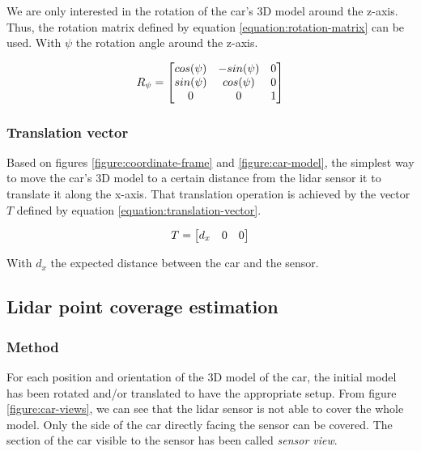\documentclass{scrartcl}
\begin{document}
    We are only interested in the rotation of the car's 3D model around the
    z-axis. Thus, the rotation matrix defined by equation 
    \ref{equation:rotation-matrix} can be used. With $\psi$ the rotation angle
    around the z-axis.

    \begin{equation}
      \centering
      R_{\psi} =
        \begin{bmatrix}
          cos(\psi) & -sin(\psi) & 0 \\
          sin(\psi) & cos(\psi) & 0 \\
          0 & 0 & 1
        \end{bmatrix}
        \label{equation:rotation-matrix}
    \end{equation}

    \subsubsection{Translation vector}

    Based on figures \ref{figure:coordinate-frame} and \ref{figure:car-model},
    the simplest way to move the car's 3D model to a certain
    distance from the lidar sensor it to translate it along the x-axis. That
    translation operation is achieved by the vector $T$ defined by equation
    \ref{equation:translation-vector}.

    \begin{equation}
      \centering
      T =
      \begin{bmatrix}
        d_x & 0 & 0
      \end{bmatrix}
      \label{equation:translation-vector}
    \end{equation}

    With $d_x$ the expected distance between the car and the sensor.

  \subsection{Lidar point coverage estimation}

  \subsubsection{Method}

  For each position and orientation of the 3D model of the car, the initial
  model has been rotated and/or translated to have the appropriate setup.
  From figure \ref{figure:car-views}, we can see that the lidar sensor
  is not able to cover the whole model.
  Only the side of the car directly facing the sensor can be covered.
  The section of the car visible to the sensor has been called
  \textit{sensor view}.
\end{document}
